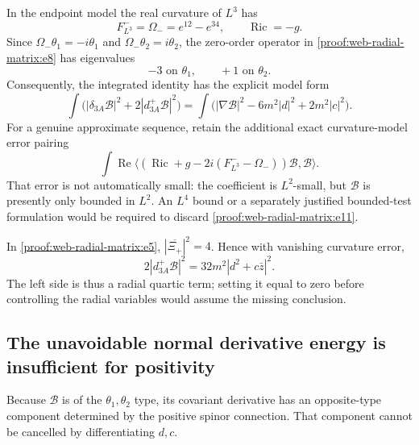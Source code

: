 In the endpoint model the real curvature of \(L^3\) has \[
 F_{L^3}^-=\Omega_-=e^{12}-e^{34},\qquad\operatorname{Ric}=-g.
\] Since \(\Omega_-\theta_1=-i\theta_1\) and \(\Omega_-\theta_2=i\theta_2\), the zero-order operator in \eqref{proof:web-radial-matrix:e8} has eigenvalues \[
 \boxed{-3\text{ on }\theta_1,\qquad +1\text{ on }\theta_2.}
 \tag{\thesection.9}\label{proof:web-radial-matrix:e9}
\] Consequently, the integrated identity has the explicit model form \[
 \int\bigl(|\delta_{3A}\mathcal B|^2+2|d_{3A}^+\mathcal B|^2\bigr)
 =\int\bigl(|\nabla\mathcal B|^2
           -6m^2|d|^2+2m^2|c|^2\bigr).
 \tag{\thesection.10}\label{proof:web-radial-matrix:e10}
\] For a genuine approximate sequence, retain the additional exact curvature-model error pairing \[
 \int\operatorname{Re}\langle
   (\operatorname{Ric}+g-2i(F_{L^3}^--\Omega_-))\mathcal B,
        \mathcal B\rangle.
 \tag{\thesection.11}\label{proof:web-radial-matrix:e11}
\] That error is not automatically small: the coefficient is \(L^2\)-small, but \(\mathcal B\) is presently only bounded in \(L^2\). An \(L^4\) bound or a separately justified bounded-test formulation would be required to discard \eqref{proof:web-radial-matrix:e11}.

In \eqref{proof:web-radial-matrix:e5}, \(|\overline{\Xi_+}|^2=4\). Hence with vanishing curvature error, \[
 2|d_{3A}^+\mathcal B|^2=32m^2|d^2+c\bar z|^2.
 \tag{\thesection.12}\label{proof:web-radial-matrix:e12}
\] The left side is thus a radial quartic term; setting it equal to zero before controlling the radial variables would assume the missing conclusion.

\hypertarget{proof:web-radial-matrix:s4}{%
\subsection{The unavoidable normal derivative energy is insufficient for positivity}\label{proof:web-radial-matrix:s4}}

Because \(\mathcal B\) is of the \(\theta_1,\theta_2\) type, its covariant derivative has an opposite-type component determined by the positive spinor connection. That component cannot be cancelled by differentiating \(d,c\).

